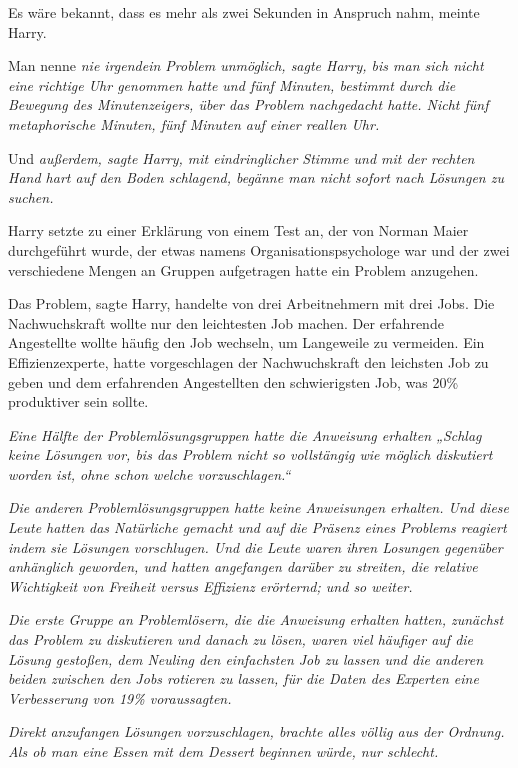 {Es wäre bekannt, dass es mehr als zwei Sekunden in Anspruch nahm, meinte Harry.

Man nenne \emph{nie \emph{irgendein} Problem unmöglich, sagte Harry, bis man sich nicht eine richtige Uhr genommen hatte und fünf Minuten, bestimmt durch die Bewegung des Minutenzeigers, über das Problem nachgedacht hatte. Nicht fünf metaphorische Minuten, fünf Minuten auf einer reallen Uhr.}

Und \emph{außerdem, sagte Harry, mit eindringlicher Stimme und mit der rechten Hand hart auf den Boden schlagend, begänne man nicht sofort nach Lösungen zu suchen.}

Harry setzte zu einer Erklärung von einem Test an, der von Norman Maier durchgeführt wurde, der etwas namens Organisationspsychologe war und der zwei verschiedene Mengen an Gruppen aufgetragen hatte ein Problem anzugehen.

Das Problem, sagte Harry, handelte von drei Arbeitnehmern mit drei Jobs. Die Nachwuchskraft wollte nur den leichtesten Job machen. Der erfahrende Angestellte wollte häufig den Job wechseln, um Langeweile zu vermeiden. Ein Effizienzexperte, hatte vorgeschlagen der Nachwuchskraft den leichsten Job zu geben und dem erfahrenden Angestellten den schwierigsten Job, was 20\% produktiver sein sollte.

\emph{Eine Hälfte der Problemlösungsgruppen hatte die Anweisung erhalten „Schlag keine Lösungen vor, bis das Problem nicht so vollstängig wie möglich diskutiert worden ist, ohne schon welche vorzuschlagen.“}

\emph{Die anderen Problemlösungsgruppen hatte keine Anweisungen erhalten. Und diese Leute hatten das Natürliche gemacht und auf die Präsenz eines Problems reagiert indem sie Lösungen vorschlugen. Und die Leute waren ihren Losungen gegenüber anhänglich geworden, und hatten angefangen darüber zu streiten, die relative Wichtigkeit von Freiheit versus Effizienz erörternd; und so weiter.}

\emph{Die erste Gruppe an Problemlösern, die die Anweisung erhalten hatten, zunächst das Problem zu diskutieren und danach zu lösen, waren viel häufiger auf die Lösung gestoßen, dem Neuling den einfachsten Job zu lassen und die anderen beiden zwischen den Jobs rotieren zu lassen, für die Daten des Experten eine Verbesserung von 19\% voraussagten.}

\emph{Direkt anzufangen Lösungen vorzuschlagen, brachte alles völlig aus der Ordnung. Als ob man eine Essen mit dem Dessert beginnen würde, nur schlecht.}

}
